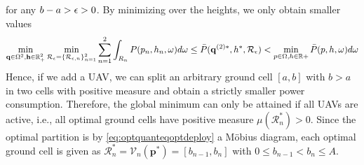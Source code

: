 \documentclass[12pt,onecolumn,journal,draftclsnofoot,letterpaper]{IEEEtran}
\newif\ifarxiv\arxivfalse
\renewcommand{\vq}{\mathbf p}
\renewcommand{\vp}{\mathbf q}
\newcommand{\Pbar}{\ensuremath{\bar{P}}}         %
\newcommand{\Vor}{\ensuremath{\mathcal{V}}}         %
\newcommand{\Rset}{\ensuremath{\mathcal R}}
\begin{document}
  for any $b-a>\epsilon>0$. By minimizing over the heights, we only obtain smaller values
  \begin{align}
    \min_{ \vp\in\Ome^2, \vh\in\R_+^2} \min_{\Rset_{\eps}=\{\Rset_{\eps,n}\}_{n=1}^2}
    \sum_{n=1}^2 \int_{R_n} P(p_n,h_n,\ome)d\ome \leq
    \Pbar(\vp^{(2)*},h^*,\Rset_{\eps}) < \min_{p\in\Ome,h\in\R+} \Pbar(p,h,\ome)d\ome\notag
  \end{align}
  Hence, if we add a UAV, we can split an arbitrary ground cell $[a,b]$ with $b>a$ in two cells with positive measure
  and obtain a strictly smaller power consumption. Therefore, the global minimum can only be attained if all UAVs are
  active, i.e., all optimal ground cells have positive measure $\mu(\Rset^*_n)>0$. Since the optimal partition is by
  \eqref{eq:optquanteqoptdeploy} a Möbius diagram, each optimal ground cell is given as
  $\Rset^*_n=\Vor_n(\vq^*)=[b_{n-1},b_n]$ with $0 \leq b_{n-1}<b_n\leq A$. 
  \fi
\fi %
%
\ifarxiv
\end{document}
